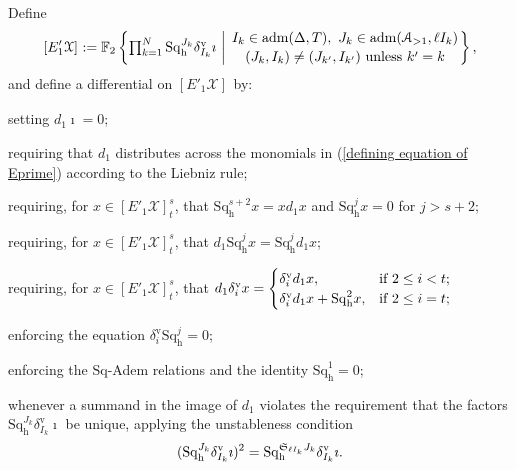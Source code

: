 \documentclass[11pt]{amsart} \renewcommand{\baselinestretch}{1.2}
\theoremstyle{plain}
\numberwithin{equation}{section} %
\theoremstyle{plain}
\numberwithin{equation}{chapter} %
\newcommand{\calA}{\mathcal{A}}
\newcommand{\calx}{\mathcal{X}}
\newcommand{\Sq}{\mathrm{Sq}}
\newcommand{\LieSteen}{\calA}
\newcommand{\aDTnoplus}{\mathrm{adm}(\Delta,T)}
\newcommand{\aS}[1]{\mathrm{adm}(\LieSteen_{>1},#1)}
\newcommand{\F}{\mathbb{F}}
\newcommand{\Ftwo}{\F_2}
\newcommand{\STOP}{\mathfrak{S}}
\newcommand{\Eprime}[5]{[E'_{#2}#3]^{#4}_{#5}}
\newcommand{\uver}{^\mathrm{v}}
\newcommand{\dhor}{_\mathrm{h}}
\newcommand{\Sqh}{\mathrm{Sq}\dhor}
\newcommand{\deltav}{\delta\uver}
\begin{document}
\begin{Calculations of HWn}
Define
\begin{equation}\label{defining equation of Eprime}
\Eprime{blank}{1}{\calx}{}{}:=
\Ftwo\left\{\textstyle\prod_{k=1}^N\Sqh^{J_k}\deltav_{I_k}\imath\ \middle|\ 
\genfrac{}{}{0pt}{}{I_k\in \aDTnoplus,\ J_k\in \aS{\ell I_k}}{(J_k,I_k)\neq (J_{k'},I_{k'})\textup{ unless }k'=k}
\right\},
\end{equation}
and define a differential on $\Eprime{blank}{1}{\calx}{}{}$ by:
\setcounter{keepeqno}{\value{equation}}%
  \begin{list}{(\theequation)}{}%
  \setcounter{equation}{\value{keepeqno}}
\item \label{ITM1} setting $d_1\imath=0$;
\item \label{ITM2} requiring that $d_1$ distributes across the monomials in (\ref{defining equation of Eprime}) according to the Liebniz rule;
\item \label{ITM2.5} %
requiring, for $x\in \Eprime{blank}{1}{\calx}{s}{t}$, that $\Sqh^{s+2}x=xd_1x$ and $\Sqh^jx=0$ for $j>s+2$;
\item \label{ITM3} requiring, for $x\in \Eprime{blank}{1}{\calx}{s}{t}$, that $d_1\Sqh^jx = \Sqh^jd_1x$;
\item \label{ITM4}
requiring, for $x\in \Eprime{blank}{1}{\calx}{s}{t}$, that $d_1\deltav_ix=
\begin{cases}
\deltav_id_1x,&\textup{if $2\leq i < t$};\\
\deltav_id_1x + \Sqh^2 x,&\textup{if $2\leq i = t$};
\end{cases}$
\item \label{ITM5} enforcing the equation $\deltav_i\Sqh^j=0$;
\item \label{ITM6} enforcing the $\Sq$-Adem relations and the identity $\Sqh^1=0$;
\item \label{ITM7} 
whenever a summand in the image of $d_1$ violates the requirement that the factors $\Sqh^{J_k}\deltav_{I_k}\imath$ be unique, applying the unstableness condition
\[(\Sqh^{J_k}\deltav_{I_k}\imath)^{2}=\Sqh^{\smash{\STOP_{\ell I_k}J_k}}\deltav_{I_k}\imath.\]
\end{list}

\end{Calculations of HWn}
\end{document}
